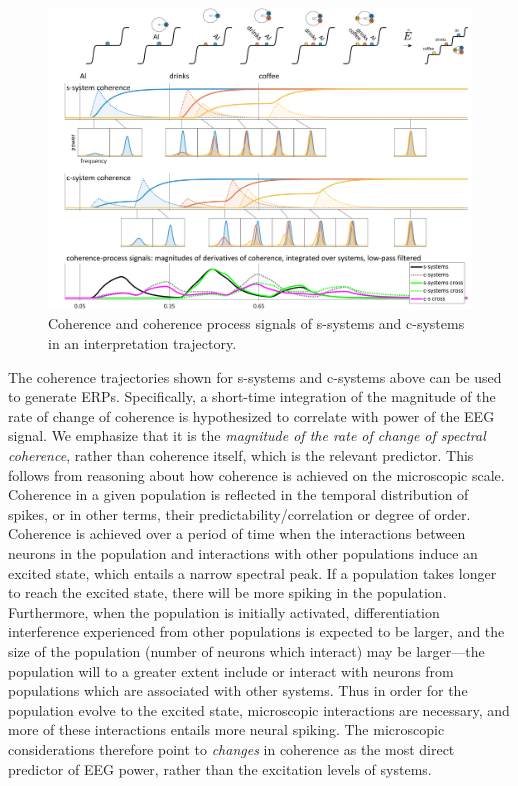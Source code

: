   
\begin{figure}
\includegraphics[width=\textwidth]{figures/Tilsen-img141.png}
\caption{Coherence and coherence process signals of s-systems and c-systems in an interpretation trajectory.}
\label{fig:6:22}
\end{figure}
 

  The coherence trajectories shown for s-systems and c-systems above can be used to generate ERPs. Specifically, a short-time integration of the magnitude of the rate of change of coherence is hypothesized to correlate with power of the EEG signal. We emphasize that it is the \textit{magnitude of the rate of change of spectral coherence}, rather than coherence itself, which is the relevant predictor. This follows from reasoning about how coherence is achieved on the microscopic scale. Coherence in a given population is reflected in the temporal distribution of spikes, or in other terms, their predictability/correlation or degree of order. Coherence is achieved over a period of time when the interactions between neurons in the population and interactions with other populations induce an excited state, which entails a narrow spectral peak. If a population takes longer to reach the excited state, there will be more spiking in the population. Furthermore, when the population is initially activated, differentiation interference experienced from other populations is expected to be larger, and the size of the population (number of neurons which interact) may be larger—the population will to a greater extent include or interact with neurons from populations which are associated with other systems. Thus in order for the population evolve to the excited state, microscopic interactions are necessary, and more of these interactions entails more neural spiking. The microscopic considerations therefore point to \textit{changes} in coherence as the most direct predictor of EEG power, rather than the excitation levels of systems. 

